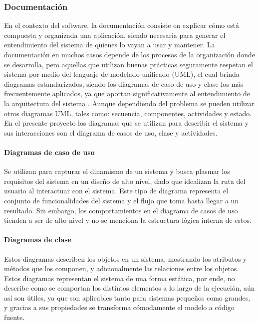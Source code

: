 \subsubsection{Documentación}
En el contexto del software, la documentación consiste en explicar cómo está compuesta y organizada una aplicación, siendo necesaria para generar el entendimiento del sistema de quienes lo vayan a usar y mantener. La documentación en muchos casos depende de los procesos de la organización donde se desarrolla, pero aquellas que utilizan buenas prácticas seguramente respetan el sistema por medio del lenguaje de modelado unificado (UML), el cual brinda diagramas estandarizados, siendo los diagramas de caso de uso y clase los más frecuentemente aplicados, ya que aportan significativamente al entendimiento de la arquitectura del sistema \parencite{Rumbaugh2004}. Aunque dependiendo del problema se pueden utilizar otros diagramas UML, tales como: secuencia, componentes, actividades y estado. 
En el presente proyecto los diagramas que se utilizan para describir el sistema y sus interacciones son el diagrama de casos de uso, clase y actividades.

\paragraph{Diagramas de caso de uso} Se utilizan para capturar el dinamismo de un sistema y busca plasmar los requisitos del sistema en un diseño de alto nivel, dado que idealizan la ruta del usuario al interactuar con el sistema. Este tipo de diagrama representa el conjunto de funcionalidades del sistema y el flujo que toma hasta llegar a un resultado. Sin embargo, los comportamientos en el diagrama de casos de uso tienden a ser de alto nivel y no se menciona la estructura lógica interna de estos. 

\paragraph{Diagramas de clase} Estos diagramas describen los objetos en un sistema, mostrando los atributos y métodos que los componen, y adicionalmente las relaciones entre los objetos. Estos diagramas representan el sistema de una forma estática, por ende, no describe como se comportan los distintos elementos a lo largo de la ejecución, aún así son útiles, ya que son aplicables tanto para sistemas pequeños como grandes, y gracias a sus propiedades se transforma cómodamente el modelo a código fuente.

